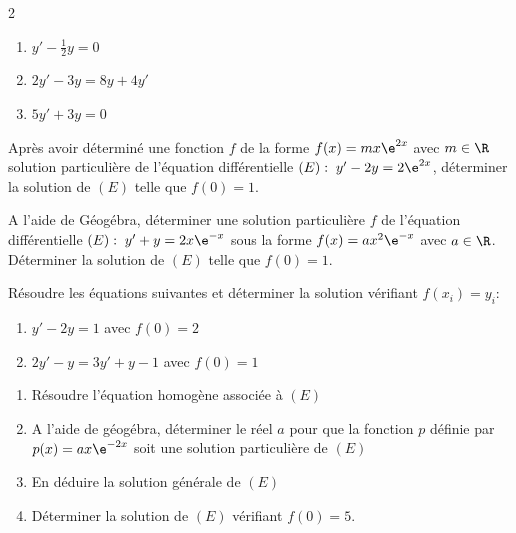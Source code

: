\def\level{BTS}  %
\def\course{CIEL 2}
\def\chaptername{CIEL2~--~Accompagnement Personnalisé} %
\def\docpart{Equations différentielles} %
\def\docname{C202} %
\pagestyle{cours_FP}
\makeheaderBTS{} %

\begin{multicols}{2}

	\begin{exercice_cours}{}
		\begin{enumerate}
			\item $y'-\frac{1}{2}y=0$
			\item $2y'-3y=8y+4y'$
			\item $5y'+3y=0$
		\end{enumerate}
	\end{exercice_cours}

	\begin{exercice_cours}[\quad]{}
		Après avoir déterminé une fonction $f$ de la forme $f(x)=mx\e^{2x}$ avec $m \in \R$ solution particulière de l'équation différentielle $(E):\; y'-2y=2\e^{2x}$, déterminer la solution de $(E)$ telle que $f(0)=1$.
	\end{exercice_cours}

	\begin{exercice_cours}[\quad]{}
A l'aide de Géogébra, déterminer une solution particulière $f$ de l'équation différentielle $(E):\; y'+y=2x\e^{-x}$ sous la forme $f(x)=ax^2\e^{-x}$ avec $a \in \R$. Déterminer la solution de $(E)$ telle que $f(0)=1$.
	\end{exercice_cours}

		\begin{exercice_cours}[\quad]{}
			Résoudre les équations suivantes et déterminer la solution vérifiant $f(x_i)=y_i$:
			\begin{enumerate}
				\item $y'-2y=1$ avec $f(0)=2$
				\item $2y'-y=3y'+y-1$ avec $f(0)=1$
			\end{enumerate}
		\end{exercice_cours}


\end{multicols}

		\begin{exercice_cours}[	On considère l'équation différentielle $(E):\; y'+2y=4\e^{-2x}$.]{}


			\begin{enumerate}
				\item Résoudre l'équation homogène associée à $(E)$
				\item A l'aide de géogébra, déterminer le réel $a$ pour que la fonction $p$ définie par $p(x)=ax\e^{-2x}$ soit une solution particulière de $(E)$
				\item En déduire la solution générale de $(E)$
				\item Déterminer la solution de $(E)$ vérifiant $f(0)=5$.
			\end{enumerate}
		\end{exercice_cours}



